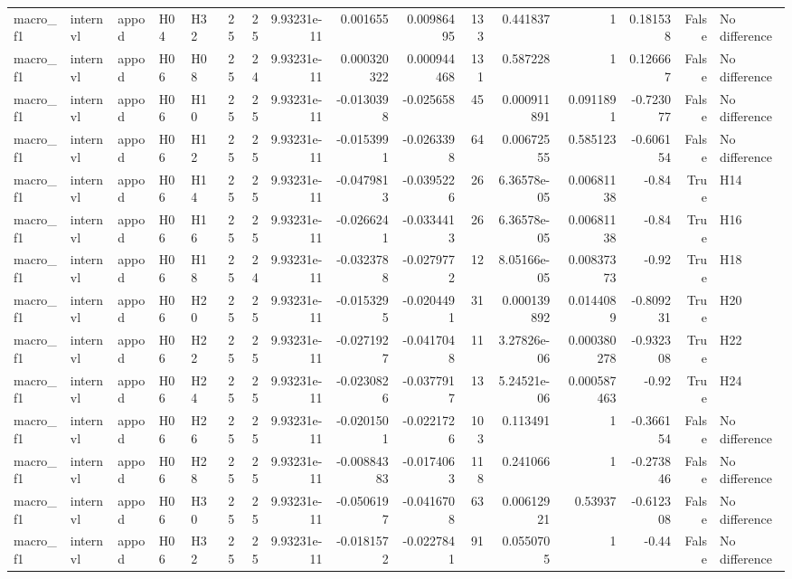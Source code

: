 \begin{longtable}{lllllrrrrrrrrrrl}
macro\_f1 & internvl & appod & H04 & H32 & 25 & 25 & 9.93231e-11 & 0.001655 & 0.00986495 & 133 & 0.441837 & 1 & 0.181538 & False & No difference \\
macro\_f1 & internvl & appod & H06 & H08 & 25 & 24 & 9.93231e-11 & 0.000320322 & 0.000944468 & 131 & 0.587228 & 1 & 0.126667 & False & No difference \\
macro\_f1 & internvl & appod & H06 & H10 & 25 & 25 & 9.93231e-11 & -0.0130398 & -0.025658 & 45 & 0.000911891 & 0.0911891 & -0.723077 & False & No difference \\
macro\_f1 & internvl & appod & H06 & H12 & 25 & 25 & 9.93231e-11 & -0.0153991 & -0.0263398 & 64 & 0.00672555 & 0.585123 & -0.606154 & False & No difference \\
macro\_f1 & internvl & appod & H06 & H14 & 25 & 25 & 9.93231e-11 & -0.0479813 & -0.0395226 & 26 & 6.36578e-05 & 0.00681138 & -0.84 & True & H14 \\
macro\_f1 & internvl & appod & H06 & H16 & 25 & 25 & 9.93231e-11 & -0.0266241 & -0.0334413 & 26 & 6.36578e-05 & 0.00681138 & -0.84 & True & H16 \\
macro\_f1 & internvl & appod & H06 & H18 & 25 & 24 & 9.93231e-11 & -0.0323788 & -0.0279772 & 12 & 8.05166e-05 & 0.00837373 & -0.92 & True & H18 \\
macro\_f1 & internvl & appod & H06 & H20 & 25 & 25 & 9.93231e-11 & -0.0153295 & -0.0204491 & 31 & 0.000139892 & 0.0144089 & -0.809231 & True & H20 \\
macro\_f1 & internvl & appod & H06 & H22 & 25 & 25 & 9.93231e-11 & -0.0271927 & -0.0417048 & 11 & 3.27826e-06 & 0.000380278 & -0.932308 & True & H22 \\
macro\_f1 & internvl & appod & H06 & H24 & 25 & 25 & 9.93231e-11 & -0.0230826 & -0.0377917 & 13 & 5.24521e-06 & 0.000587463 & -0.92 & True & H24 \\
macro\_f1 & internvl & appod & H06 & H26 & 25 & 25 & 9.93231e-11 & -0.0201501 & -0.0221726 & 103 & 0.113491 & 1 & -0.366154 & False & No difference \\
macro\_f1 & internvl & appod & H06 & H28 & 25 & 25 & 9.93231e-11 & -0.00884383 & -0.0174063 & 118 & 0.241066 & 1 & -0.273846 & False & No difference \\
macro\_f1 & internvl & appod & H06 & H30 & 25 & 25 & 9.93231e-11 & -0.0506197 & -0.0416708 & 63 & 0.00612921 & 0.53937 & -0.612308 & False & No difference \\
macro\_f1 & internvl & appod & H06 & H32 & 25 & 25 & 9.93231e-11 & -0.0181572 & -0.0227841 & 91 & 0.0550705 & 1 & -0.44 & False & No difference \\

\end{longtable}
